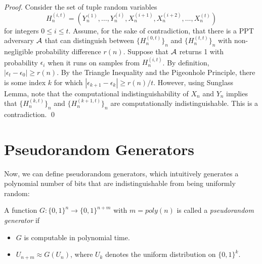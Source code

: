 \begin{proof}
Consider the set of tuple random variables
$$H^{(i,t)}_n = (Y_n^{(1)},\hdots,Y_n^{(i)},X_n^{(i+1)},X_n^{(i+2)},\hdots,X_n^{(t)})$$
for integers $0\le i\le t$. Assume, for the sake of contradiction, that there is a PPT adversary ${\mathcal A}$ that can distinguish between $\{H^{(0,t)}_n\}_n$ and $\{H^{(t,t)}_n\}_n$ with non-negligible probability difference $r(n)$. Suppose that ${\mathcal A}$ returns 1 with probability $\epsilon_i$ when it runs on samples from $H^{(i,t)}_n$. By definition, $|\epsilon_t - \epsilon_0|\ge r(n)$. By the Triangle Inequality and the Pigeonhole Principle, there is some index $k$ for which
$|\epsilon_{k+1} - \epsilon_k|\ge r(n)/t$. However, using Sunglass Lemma, note that the computational indistinguishability of $X_n$ and $Y_n$ implies that $\{H^{(k,t)}_n\}_n$ and $\{H^{(k+1,t)}_n\}_n$ are computationally indistinguishable. This is a contradiction. 
\qed
%
%
\end{proof}

\section{Pseudorandom Generators}
Now, we can define pseudorandom generators, which intuitively generates a polynomial number of bits that are indistinguishable from being uniformly random:
\begin{definition}
A function $G:\{0,1\}^n\rightarrow \{0,1\}^{n+m}$ with $m = poly(n)$ is called a \emph{pseudorandom generator} if
\begin{itemize}
\item $G$ is computable in polynomial time.
\item $U_{n+m}\approx G(U_n)$, where $U_k$ denotes the uniform distribution on $\{0,1\}^k$.
\end{itemize}
\end{definition}


